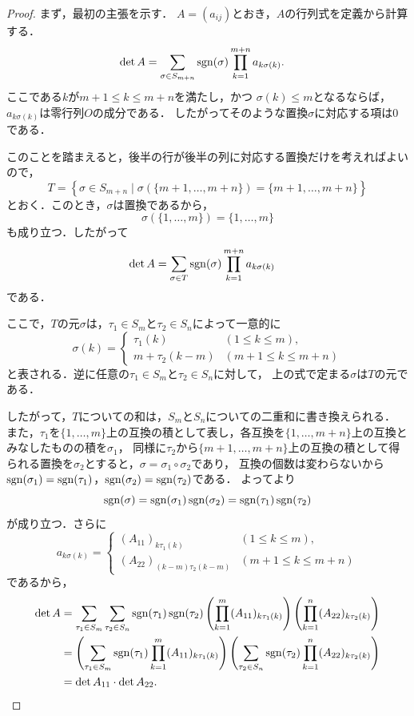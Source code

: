 \begin{tleftbar}
\begin{proof}
  まず，最初の主張を示す．
  $A=(a_{ij})$とおき，$A$の行列式を定義から計算する．
  \begin{align*}
    \det A
    &=
    \sum_{\sigma \in S_{m+n}} \sgn(\sigma)
    \prod_{k=1}^{m+n} a_{k\sigma(k)}.
  \end{align*}
  ここである$k$が$m+1 \le k \le m+n$を満たし，かつ
  $\sigma(k) \le m$となるならば，$a_{k\sigma(k)}$は零行列$O$の成分である．
  したがってそのような置換$\sigma$に対応する項は$0$である．

  このことを踏まえると，後半の行が後半の列に対応する置換だけを考えればよいので，
  \[
    T=
    \left\{
      \sigma \in S_{m+n}
      \mid
      \sigma(\{m+1,\dots,m+n\})=\{m+1,\dots,m+n\}
    \right\}
  \]
  とおく．このとき，$\sigma$は置換であるから，
  \[
    \sigma(\{1,\dots,m\})=\{1,\dots,m\}
  \]
  も成り立つ．したがって
  \begin{align*}
    \det A
    &=
    \sum_{\sigma \in T}
    \sgn(\sigma)
    \prod_{k=1}^{m+n} a_{k\sigma(k)}
  \end{align*}
  である．

  ここで，$T$の元$\sigma$は，$\tau_1 \in S_m$と$\tau_2 \in S_n$によって一意的に
  \[
    \sigma(k) =
    \begin{cases}
      \tau_1(k) & (1 \le k \le m),\\
      m + \tau_2(k-m) & (m+1 \le k \le m+n)
    \end{cases}
  \]
  と表される．逆に任意の$\tau_1 \in S_m$と$\tau_2 \in S_n$に対して，
  上の式で定まる$\sigma$は$T$の元である．

  したがって，$T$についての和は，$S_m$と$S_n$についての二重和に書き換えられる．
  また，$\tau_1$を$\{1, \dots, m\}$上の互換の積として表し，各互換を$\{1, \dots, m+n\}$上の互換とみなしたものの積を$\sigma_1$，
  同様に$\tau_2$から$\{m+1, \dots, m+n\}$上の互換の積として得られる置換を$\sigma_2$とすると，$\sigma = \sigma_1 \circ \sigma_2$であり，
  互換の個数は変わらないから$\operatorname{sgn}(\sigma_1) = \operatorname{sgn}(\tau_1)$，$\operatorname{sgn}(\sigma_2) = \operatorname{sgn}(\tau_2)$である．
  よってより
  \[
    \operatorname{sgn}(\sigma)=\operatorname{sgn}(\sigma_1)\operatorname{sgn}(\sigma_2)=\operatorname{sgn}(\tau_1)\operatorname{sgn}(\tau_2)
  \]
  が成り立つ．さらに
  \[
    a_{k\sigma(k)} =
    \begin{cases}
      (A_{11})_{k\tau_1(k)} & (1 \le k \le m),\\
      (A_{22})_{(k-m)\tau_2(k-m)} & (m+1 \le k \le m+n)
    \end{cases}
  \]
  であるから，
  \begin{align*}
    \det A
    &=
    \sum_{\tau_1\in S_m}
    \sum_{\tau_2\in S_n}
    \sgn(\tau_1)\sgn(\tau_2)
    \left(
      \prod_{k=1}^{m} (A_{11})_{k\tau_1(k)}
    \right)
    \left(
      \prod_{k=1}^{n} (A_{22})_{k\tau_2(k)}
    \right) \\
    &=
    \left(
      \sum_{\tau_1\in S_m}
      \sgn(\tau_1)
      \prod_{k=1}^{m} (A_{11})_{k\tau_1(k)}
    \right)
    \left(
      \sum_{\tau_2\in S_n}
      \sgn(\tau_2)
      \prod_{k=1}^{n} (A_{22})_{k\tau_2(k)}
    \right) \\
    &= \det A_{11} \cdot \det A_{22}.
  \end{align*}


\end{proof}
\end{tleftbar}

